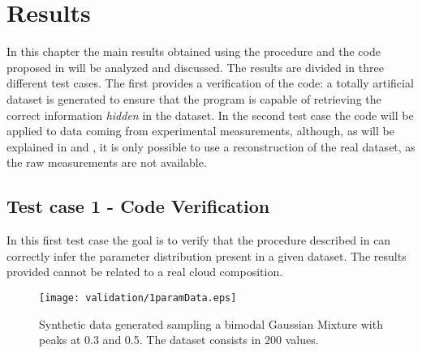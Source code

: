\chapter{Results}
	In this chapter the main results obtained using the procedure and the code proposed in  will be analyzed and discussed. The results are divided in three different test cases. The first provides a verification of the code: a totally artificial dataset is generated to ensure that the program is capable of retrieving the correct information \textit{hidden} in the dataset. In the second test case the code will be applied to data coming from experimental measurements, although, as will be explained in  and , it is only possible to use a reconstruction of the real dataset, as the raw measurements are not available. 
	
	
	
	
	
	
	
	
	
	
	
	
	
	
	
	
	
	\section{Test case 1 - Code Verification}
	\label{sec: TC1}	
		In this first test case the goal is to verify that the procedure described in  can correctly infer the parameter distribution present in a given dataset. The results provided cannot be related to a real cloud composition. 		
		\begin{figure}
			\centering
			\texttt{[image: validation/1paramData.eps]}
			\caption{Synthetic data generated sampling a bimodal Gaussian Mixture with peaks at 0.3 and 0.5. The dataset consists in 200 values.}
			\label{val: 1paramData}
		\end{figure}
		
